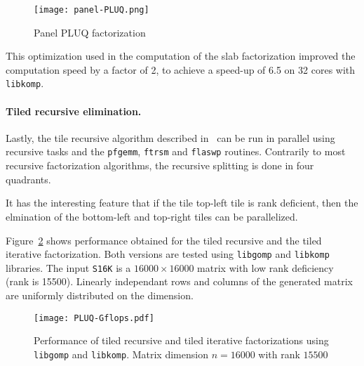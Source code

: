 \documentclass{article}
\newcommand{\pfgemm}{\texttt{pfgemm}\xspace}
\newcommand{\pftrsm}{\texttt{ftrsm}\xspace}
\newcommand{\pflaswp}{\texttt{flaswp}\xspace}
\newcommand{\libkomp}{\texttt{libkomp}\xspace}
\newcommand{\libgomp}{\texttt{libgomp}\xspace}
\begin{document}
 
 
 

 
 
 
 
 
 
 
 
\begin{figure}[ht!]
\centering
\texttt{[image: panel-PLUQ.png]}
\caption{Panel PLUQ factorization}
\label{fig:panel-pluq}
\end{figure}
 
 
 

This optimization used in the computation of the slab factorization
improved the computation speed by a factor of 2, to achieve a speed-up
of 6.5 on 32 cores with \libkomp.  

\vspace{-1em}
\paragraph{Tiled recursive elimination.}
Lastly, the tile recursive algorithm described in~\cite{DPS13} can be run in
parallel using recursive tasks and the \pfgemm, \pftrsm and \pflaswp routines.
Contrarily to most recursive factorization algorithms, the recursive splitting
is done in four quadrants.
 
 
 
 
 
 
 
It has the interesting feature that if the tile top-left tile is rank deficient,
then the elmination of the bottom-left and top-right tiles can be parallelized.
 
 
 
 
 
 
 
 
 
 
 

Figure~\ref{fig:PLUQ-Gflops} shows performance obtained for the tiled recursive
and the tiled iterative factorization. Both
versions are tested using \libgomp and \libkomp libraries. The input \texttt{S16K} is a
$16000\times 16000$ matrix with low rank deficiency (rank is 15500). Linearly
independant rows and columns of the generated matrix are uniformly distributed
on the dimension. 

 

\begin{figure}[ht!]
\centering
\texttt{[image: PLUQ-Gflops.pdf]}\\
\caption{Performance of tiled recursive and tiled iterative factorizations
  using  \libgomp and \libkomp. Matrix dimension $n=16000$ with rank $15500$}
\label{fig:PLUQ-Gflops}
\end{figure}
\end{document}

